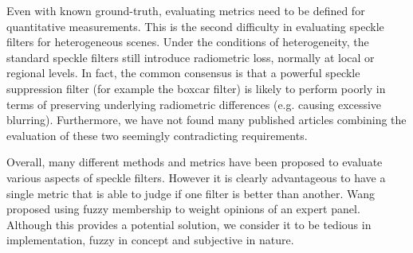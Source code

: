 \documentclass[journal]{IEEEtran}
\begin{document}
%

Even with known ground-truth, evaluating metrics need to be defined for quantitative measurements.
This is the second difficulty in evaluating speckle filters for heterogeneous scenes.
Under the conditions of heterogeneity, the standard speckle filters still introduce radiometric loss, 
	normally at local or regional levels.
In fact, the common consensus is that a powerful speckle suppression filter (for example the boxcar filter) 
	is likely to perform poorly in terms of preserving underlying radiometric differences 
	(e.g. causing excessive blurring).
Furthermore, we have not found many published articles combining the evaluation
  of these two seemingly contradicting requirements.

Overall, many different methods and metrics have been proposed to evaluate various aspects of speckle filters. 
However it is clearly advantageous to have a single metric that is able to judge if one filter is better than another. 
Wang \cite{Wang_2005_MIPR} proposed using fuzzy membership to weight opinions of an expert panel. 
Although this provides a potential solution, we consider it to be tedious in implementation, fuzzy in concept and 
	subjective in nature.
\end{document}

